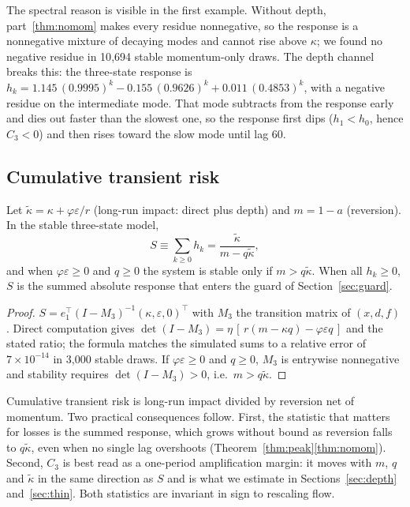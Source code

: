 The spectral reason is visible in the first example. Without depth, part~\ref{thm:nomom} makes every residue nonnegative, so the response is a nonnegative mixture of decaying modes and cannot rise above $\kappa$; we found no negative residue in 10{,}694 stable momentum-only draws. The depth channel breaks this: the three-state response is $h_k=1.145\,(0.9995)^k-0.155\,(0.9626)^k+0.011\,(0.4853)^k$, with a negative residue on the intermediate mode. That mode subtracts from the response early and dies out faster than the slowest one, so the response first dips ($h_1<h_0$, hence $C_3<0$) and then rises toward the slow mode until lag 60.

\subsection{Cumulative transient risk}

\begin{theorem}\label{thm:sum}
Let $\tilde\kappa=\kappa+\varphi\varepsilon/r$ (long-run impact: direct plus depth) and $m=1-a$ (reversion). In the stable three-state model,
\[
S\equiv\sum_{k\ge0}h_k=\frac{\tilde\kappa}{m-q\tilde\kappa},
\]
and when $\varphi\varepsilon\ge0$ and $q\ge0$ the system is stable only if $m>q\tilde\kappa$. When all $h_k\ge0$, $S$ is the summed absolute response that enters the guard of Section~\ref{sec:guard}.
\end{theorem}

\begin{proof}
$S=e_1^\top(I-M_3)^{-1}(\kappa,\varepsilon,0)^\top$ with $M_3$ the transition matrix of $(x,d,f)$. Direct computation gives $\det(I-M_3)=\eta\,[\,r(m-\kappa q)-\varphi\varepsilon q\,]$ and the stated ratio; the formula matches the simulated sums to a relative error of $7\times10^{-14}$ in 3{,}000 stable draws. If $\varphi\varepsilon\ge0$ and $q\ge0$, $M_3$ is entrywise nonnegative and stability requires $\det(I-M_3)>0$, i.e.\ $m>q\tilde\kappa$.
\end{proof}

Cumulative transient risk is long-run impact divided by reversion net of momentum. Two practical consequences follow. First, the statistic that matters for losses is the summed response, which grows without bound as reversion falls to $q\tilde\kappa$, even when no single lag overshoots (Theorem~\ref{thm:peak}\ref{thm:nomom}). Second, $C_3$ is best read as a one-period amplification margin: it moves with $m$, $q$ and $\tilde\kappa$ in the same direction as $S$ and is what we estimate in Sections~\ref{sec:depth} and~\ref{sec:thin}. Both statistics are invariant in sign to rescaling flow.
